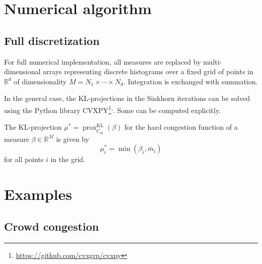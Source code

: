 \documentclass{article}
\newcommand{\RR}{\mathbb{R}}
\DeclareMathOperator{\KL}{KL}
\DeclareMathOperator{\prox}{prox}
\begin{document}
\section{Numerical algorithm}




\subsection{Full discretization}

For full numerical implementation, all measures are replaced by multi-dimensional arrays representing discrete histograms over a fixed grid of points in $\RR^d$ of dimensionality $M = N_1\times\cdots\times N_d$. Integration is exchanged with summation.

In the general case, the KL-projections in the Sinkhorn iterations can be solved using the Python library CVXPY\footnote{\url{https://github.com/cvxgrp/cvxpy}}\textsuperscript{,}. Some can be computed explicitly.


\begin{remark}
   	The KL-projection $\mu^* = \prox^{\KL}_{C_{\bar{m}}}(\beta)$ for the hard congestion function of a measure $\beta\in\RR^M$ is given by
   	\begin{equation}
   		\mu^*_i
   		= \min(\beta_i,\bar{m}_i)
   	\end{equation}
   	for all points $i$ in the grid.
\end{remark}

\begin{remark}
	
\end{remark}



\section{Examples}

\subsection{Crowd congestion}




\printbibliography{}
\end{document}
